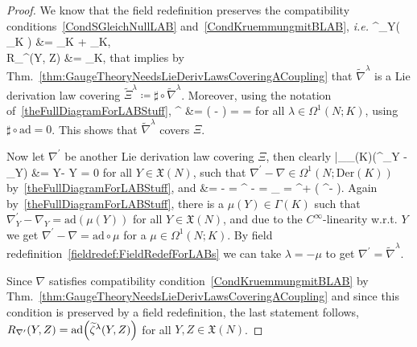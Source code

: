 \documentclass[preprint]{elsarticle}
\def\bas#1\eas{\begin{align*}#1\end{align*}}
\theoremstyle{plain}
\theoremstyle{remark}
\theoremstyle{definition}
\begin{document}
\begin{proof}
\leavevmode\newline
We know that the field redefinition preserves the compatibility conditions~\eqref{CondSGleichNullLAB} and~\eqref{CondKruemmungmitBLAB}, \textit{i.e.}
\bas
\widetilde{\nabla}^\lambda_Y\mleft( \mleft[ \mu, \nu \mright]_K \mright)
&=
_K
	+ _K, \\
R_{\widetilde{\nabla}^\lambda}(Y, Z) \mu
&=
_K,
\eas
that implies by Thm.~\ref{thm:GaugeTheoryNeedsLieDerivLawsCoveringACoupling} that $\widetilde{\nabla}^\lambda$ is a Lie derivation law covering $\widetilde{\Xi}^\lambda \coloneqq \sharp \circ \widetilde{\nabla}^\lambda$. Moreover, using the notation of~\eqref{theFullDiagramForLABStuff},
\bas
\sharp \circ \widetilde{\nabla}^\lambda
&=
\sharp \circ \mleft( \nabla -  \circ \lambda \mright)
=
\sharp \circ \nabla
=
\Xi
\eas
for all $\lambda \in \Omega^1(N; K)$, using $\sharp \circ \mathrm{ad} = 0$. This shows that $\widetilde{\nabla}^\lambda$ covers $\Xi$.

Now let $\nabla^\prime$ be another Lie derivation law covering $\Xi$, then clearly
\bas
a|_{_{}(K)}(\nabla^\prime_Y - \nabla_Y)
&= Y- Y = 0
\eas
for all $Y \in \mathfrak{X}(N)$, such that $\nabla^\prime - \nabla \in \Omega^1(N; \mathrm{Der}(K))$ by~\eqref{theFullDiagramForLABStuff}, and
\bas
0
&=
\Xi - \Xi
=
\sharp \circ \nabla^\prime
	- \sharp \circ \nabla
=
\sharp \circ \underbrace{\mleft( \nabla^\prime - \nabla \mright)}_{}
=
\sharp^+ \circ \mleft( \nabla^\prime - \nabla \mright).
\eas
Again by~\eqref{theFullDiagramForLABStuff}, there is a $\mu(Y) \in \Gamma(K)$ such that $\nabla^\prime_Y - \nabla_Y = \mathrm{ad}(\mu(Y))$ for all $Y \in \mathfrak{X}(N)$, and due to the $C^\infty$-linearity w.r.t. $Y$ we get $\nabla^\prime - \nabla = \mathrm{ad} \circ \mu$ for a $\mu \in \Omega^1(N; K)$. By field redefinition~\ref{fieldredef:FieldRedefForLABs} we can take $\lambda = - \mu$ to get $\nabla^\prime = \widetilde{\nabla}^\lambda$.

Since $\nabla$ satisfies compatibility condition~\eqref{CondKruemmungmitBLAB} by Thm.~\ref{thm:GaugeTheoryNeedsLieDerivLawsCoveringACoupling} and since this condition is preserved by a field redefinition, the last statement follows, $R_{\nabla^\prime}(Y, Z) = \mathrm{ad}\mleft( \widetilde{\zeta}^\lambda(Y, Z) \mright)$ for all $Y, Z \in \mathfrak{X}(N)$.
\end{proof}
\end{document}
